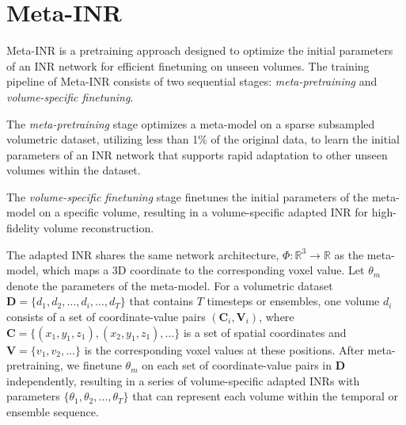 \vspace{-0.075in}
\section{Meta-INR}
\vspace{-0.025in}

Meta-INR is a pretraining approach designed to optimize the initial parameters of an INR network for efficient finetuning on unseen volumes.
The training pipeline of Meta-INR consists of two sequential stages: {\em meta-pretraining} and {\em volume-specific finetuning}. 
\begin{myitemize}
\vspace{-0.05in}
    \item The {\em meta-pretraining} stage optimizes a meta-model on a sparse subsampled volumetric dataset, utilizing less than 1\% of the original data, to learn the initial parameters of an INR network that supports rapid adaptation to other unseen volumes within the dataset. 
    \item The {\em volume-specific finetuning} stage finetunes the initial parameters of the meta-model on a specific volume, resulting in a volume-specific adapted INR for high-fidelity volume reconstruction.
\vspace{-0.05in}
\end{myitemize}
The adapted INR shares the same network architecture, $\Phi: \mathbb{R}^3 \rightarrow \mathbb{R}$ as the meta-model, which maps a 3D coordinate to the corresponding voxel value.
Let $\theta_{m}$ denote the parameters of the meta-model.
For a volumetric dataset $\mathbf{D} = \{ d_1, d_2, \dots, d_i, \dots, d_T \}$ that contains $T$ timesteps or ensembles, one volume $d_i$ consists of a set of coordinate-value pairs $(\mathbf{C}_i, \mathbf{V}_i)$, where $\mathbf{C} = \{ (x_1, y_1, z_1), (x_2, y_1, z_1), \dots \}$ is a set of spatial coordinates and $\mathbf{V} = \{ v_1, v_2, \dots \}$ is the corresponding voxel values at these positions.
After meta-pretraining, we finetune $\theta_{m}$ on each set of coordinate-value pairs in $\mathbf{D}$ independently, resulting in a series of volume-specific adapted INRs with parameters $\{ \theta_{1}, \theta_{2}, \dots, \theta_{T} \}$ that can represent each volume within the temporal or ensemble sequence.

